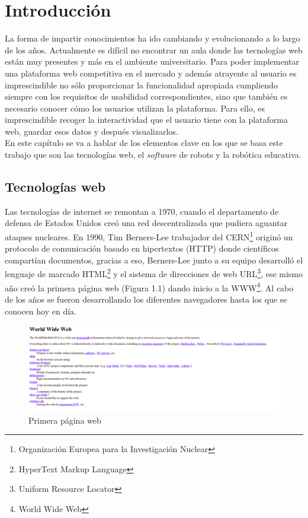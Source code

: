 \chapter{Introducción}
\label{chap:introduccion} 
La forma de impartir conocimientos ha ido cambiando y evolucionando a lo largo de los años. Actualmente es difícil no encontrar un aula donde las tecnologías web están muy presentes y más en el ambiente universitario. Para poder implementar una plataforma web competitiva en el mercado y además atrayente al usuario es imprescindible no sólo proporcionar la funcionalidad apropiada cumpliendo siempre con los requisitos de usabilidad correspondientes, sino que también es necesario conocer cómo los usuarios utilizan la plataforma. Para ello, es imprescindible recoger la interactividad que el usuario tiene con la plataforma web, guardar esos datos y después visualizarlos.\\

En este capítulo se va a hablar de los elementos clave en los que se basa este trabajo que son las tecnologías web, el \textit{software} de robots y la robótica educativa.



\section{Tecnologías web}\label{motivacion}
Las tecnologías de internet se remontan a 1970, cuando el departamento de defensa de Estados Unidos creó una red descentralizada que pudiera aguantar ataques nucleares. En 1990, Tim Berners-Lee trabajador del CERN\footnote{Organización Europea para la Investigación Nuclear} originó un protocolo de comunicación basado en hipertextos (HTTP) donde científicos compartían documentos, gracias a eso, Berners-Lee junto a su equipo desarrolló el lenguaje de marcado HTML\footnote{HyperText Markup Language} y el sistema de direcciones de web URL\footnote{Uniform Resource Locator}, ese mismo año creó la primera página web (Figura 1.1) dando inicio a la WWW\footnote{World Wide Web}. Al cabo de los años se fueron desarrollando los diferentes navegadores hasta los que se conocen hoy en día. \\

\begin{figure}[H]
    \centering
    \includegraphics[width=16cm, keepaspectratio]{img/first_web_page.png}
    \caption{Primera página web}
    \label{fig:web}
\end{figure}

